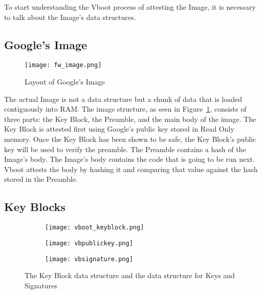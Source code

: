 To start understanding the Vboot process of attesting the Image, it is necessary
to talk about the Image's data structures.

\subsection{Google's Image}

\begin{figure}
    \centering
    \texttt{[image: fw\_image.png]}
    \caption[Google's Image Data Layout]{Layout of Google's Image~\cite{vboot-data-structures}}
    \label{fig:vboot_images}
\end{figure}

The actual Image is not a data structure but a chunk of data that is loaded
contiguously into RAM\@.
The image structure, as seen in Figure~\ref{fig:vboot_images}, consists of three
parts: the Key Block, the Preamble, and the main body of the image.
The Key Block is attested first using Google's public key stored in Read Only memory.
Once the Key Block has been shown to be safe, the Key Block's public key will be used to verify the preamble.
The Preamble contains a hash of the Image's body.
The Image's body contains the code that is going to be run next.
Vboot attests the body by hashing it and comparing that value against the hash
stored in the Preamble.

\subsection{Key Blocks}\label{sec:key_block}

\begin{figure}
\begin{subfigure}{.5\textwidth}
  \centering
  \texttt{[image: vboot\_keyblock.png]}
\end{subfigure}
\begin{subfigure}{.20\textwidth}
  \centering
  \texttt{[image: vbpublickey.png]}
\end{subfigure}
\begin{subfigure}{.20\textwidth}
  \centering
  \texttt{[image: vbsignature.png]}
\end{subfigure}
\caption[Key Block Data Structure]{The Key Block data structure and the data
structure for Keys and Signatures~\cite{vboot-data-structures}}
\label{fig:vboot_keyblock}
\end{figure}

